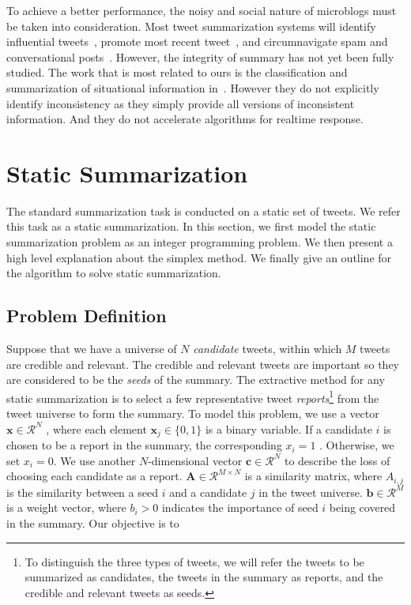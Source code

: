 \documentclass[envcountsame]{llncs}
\begin{document}
To achieve a better performance, the noisy and social nature of microblogs must be taken into consideration. Most tweet summarization systems will identify influential tweets~\cite{Hannon2010Recommending},  promote most recent tweet~\cite{Efron2011Estimation}, and circumnavigate spam and conversational posts~\cite{Gillani2017Post}. However, the integrity of summary has not yet been fully studied. The work that is most related to ours is the
classification and summarization of situational information in~\cite{Rudra2015Extracting,Rudra2016Summarizing}. However they do not explicitly identify inconsistency as they simply provide all versions of inconsistent information. And they do not accelerate algorithms for realtime response.

\section{Static Summarization}\label{sec:static}
%
The standard summarization task is conducted on a static set of tweets. We refer this task as a static summarization. In this section, we first model the static summarization problem as an integer programming problem. We then present a high level explanation about the simplex method. We finally give an outline for the algorithm to solve static summarization.
\subsection{Problem Definition}
Suppose that we have a universe of $N$ \emph{candidate} tweets, within which $M$ tweets are credible and relevant. The credible and relevant tweets are important so they are considered to be the \emph{seeds} of the summary. The extractive method for any static summarization is to select a few representative tweet \emph{reports}\footnote{To distinguish the three types of tweets, we will refer the tweets to be summarized as candidates, the tweets in the summary as reports, and the credible and relevant tweets as seeds.} from the tweet universe to form the summary. To model this problem, we use a vector $\mathbf{x}\in \mathcal{R}^N$ , where each element $\mathbf{x}_j\in \{0,1\}$ is a binary variable. If a candidate  $i$ is chosen to be a report in the summary, the corresponding $x_i=1$ . Otherwise, we set  $x_i=0$. We use another $N$-dimensional vector $\mathbf{c}\in \mathcal{R}^N$ to describe the loss of choosing each candidate as a report. $\mathbf{A}\in\mathcal{R}^{M\times N}$  is a similarity matrix, where $A_{i,j}$  is the similarity between a seed $i$ and a candidate $j$ in the tweet universe. $\mathbf{b}\in \mathcal{R}^{M}$ is a weight vector, where $b_{i}>0$ indicates the importance of seed $i$ being covered in the summary. Our objective is to
\end{document}
